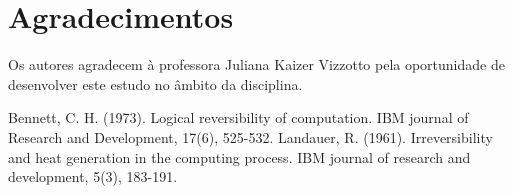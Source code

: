 \documentclass[conference]{IEEEtran}
\begin{document}
\section*{Agradecimentos}
Os autores agradecem à professora Juliana Kaizer Vizzotto pela oportunidade de desenvolver este estudo no âmbito da disciplina.

\begin{thebibliography}{00}
 Bennett, C. H. (1973). Logical reversibility of computation. IBM journal of Research and Development, 17(6), 525-532.
 Landauer, R. (1961). Irreversibility and heat generation in the computing process. IBM journal of research and development, 5(3), 183-191.

\end{thebibliography}
\end{document}
